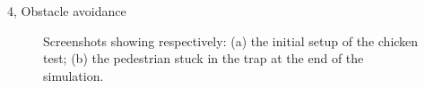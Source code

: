 \documentclass[10pt,a4paper]{article}
\begin{document}
\begin{task}{4, Obstacle avoidance}
\begin{figure}[H]
    \centering
    \caption{Screenshots showing respectively: (a) the initial setup of the chicken test; (b) the pedestrian stuck in the trap at the end of the simulation.}
    \label{fig:chicken}
\end{figure}


\end{task}
\end{document}
